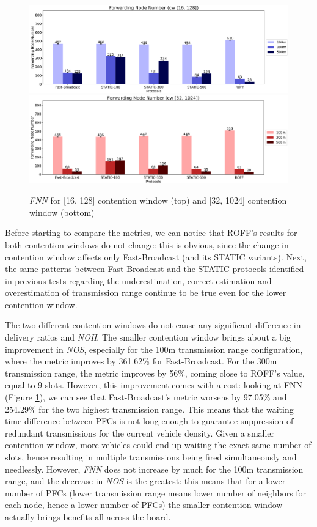 		\begin{figure}[H]
			\centering
			\includegraphics[width=1.0\textwidth]{immagini/la-25/cw/16/fnn}
			\includegraphics[width=1.0\textwidth]{immagini/la-25/cw/32/fnn}
			\caption{\textit{FNN} for [16, 128] contention window (top) and [32, 1024] contention window (bottom)}
			\label{fig:la-cw-fnn}
		\end{figure}
	
		Before starting to compare the metrics, we can notice that ROFF's results for both contention windows do not change: this is obvious, since the change in contention window affects only Fast-Broadcast (and its STATIC variants). Next, the same patterns between Fast-Broadcast and the STATIC protocols identified in previous tests regarding the underestimation, correct estimation and overestimation of transmission range continue to be true even for the lower contention window.
		
		
		The two different contention windows do not cause any significant difference in delivery ratios and \textit{NOH}. The smaller contention window brings about a big improvement in \textit{NOS}, especially for the 100m transmission range configuration, where the metric improves by 361.62\% for Fast-Broadcast. For the 300m transmission range, the metric improves by 56\%, coming close to ROFF's value, equal to 9 slots. However, this improvement comes with a cost: looking at FNN (Figure \ref{fig:la-cw-fnn}), we can see that Fast-Broadcast's metric worsens by 97.05\% and 254.29\% for the two highest transmission range. This means that the waiting time difference between PFCs is not long enough to guarantee suppression of redundant transmissions for the current vehicle density. Given a smaller contention window, more vehicles could end up waiting the exact same number of slots, hence resulting in multiple transmissions being fired simultaneously and needlessly. However, \textit{FNN} does not increase by much for the 100m transmission range, and the decrease in \textit{NOS} is the greatest: this means that for a lower number of PFCs (lower transmission range means lower number of neighbors for each node, hence a lower number of PFCs) the smaller contention window actually brings benefits all across the board. 
		
